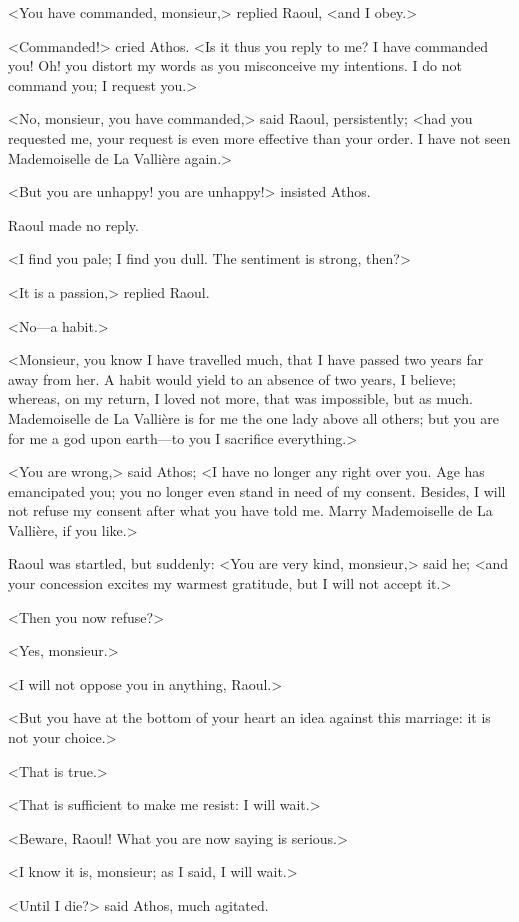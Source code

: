 <You have commanded, monsieur,> replied Raoul, <and I obey.>

<Commanded!> cried Athos. <Is it thus you reply to me? I have commanded you! Oh! you distort my words as you misconceive my intentions. I do not command you; I request you.>

<No, monsieur, you have commanded,> said Raoul, persistently; <had you requested me, your request is even more effective than your order. I have not seen Mademoiselle de La Vallière again.>

<But you are unhappy! you are unhappy!> insisted Athos.

Raoul made no reply.

<I find you pale; I find you dull. The sentiment is strong, then?>

<It is a passion,> replied Raoul.

<No—a habit.>

<Monsieur, you know I have travelled much, that I have passed two years far away from her. A habit would yield to an absence of two years, I believe; whereas, on my return, I loved not more, that was impossible, but as much. Mademoiselle de La Vallière is for me the one lady above all others; but you are for me a god upon earth—to you I sacrifice everything.>

<You are wrong,> said Athos; <I have no longer any right over you. Age has emancipated you; you no longer even stand in need of my consent. Besides, I will not refuse my consent after what you have told me. Marry Mademoiselle de La Vallière, if you like.>

Raoul was startled, but suddenly: <You are very kind, monsieur,> said he; <and your concession excites my warmest gratitude, but I will not accept it.>

<Then you now refuse?>

<Yes, monsieur.>

<I will not oppose you in anything, Raoul.>

<But you have at the bottom of your heart an idea against this marriage: it is not your choice.>

<That is true.>

<That is sufficient to make me resist: I will wait.>

<Beware, Raoul! What you are now saying is serious.>

<I know it is, monsieur; as I said, I will wait.>

<Until I die?> said Athos, much agitated.

